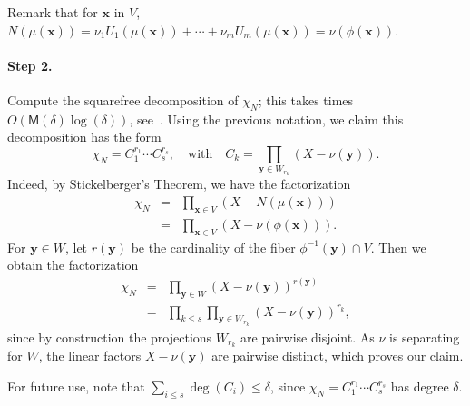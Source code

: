 \documentclass[12pt]{article}
\def\M {\ensuremath{\mathsf{M}}}
\def\x {\ensuremath{\mathbf{x}}}
\def\y {\ensuremath{\mathbf{y}}}
\begin{document}
Remark that for $\x$ in $V$, $N(\mu(\x))=\nu_1 U_1(\mu(\x)) + \cdots +
\nu_m U_m(\mu(\x))=\nu(\phi(\x))$.

\paragraph{Step 2.} Compute the squarefree decomposition of
$\chi_N$; this takes times $O(\M(\delta)\log(\delta))$,
see~\cite[Chapter~14]{GaGe03}.  Using the previous notation, we claim
this decomposition has the form
\[
\chi_N = C_1^{r_1} \cdots C_s^{r_s}, \quad\text{with}\quad C_k =
\prod_{\y \in W_{r_k}} (X-\nu(\y)).
\]
Indeed, by Stickelberger's Theorem, we have the factorization
\[
\begin{array}{rcl}
  \chi_N &=& \prod_{\x \in V} (X-N(\mu(\x)))\\[2mm]
  &=& \prod_{\x \in V} (X-\nu(\phi(\x))).
\end{array}
\]
For $\y\in W$, let $r(\y)$ be the cardinality of the fiber
$\phi^{-1}(\y) \cap V$. Then we obtain the factorization
\[
\begin{array}{rcl}
  \chi_N&=& \prod_{\y \in W} (X-\nu(\y))^{r(\y)} \\[2mm]
  &=& \prod_{k \le s} \prod_{\y \in W_{r_k}} (X-\nu(\y))^{r_k},
\end{array}
\]
since by construction the projections $W_{r_k}$ are pairwise
disjoint. As $\nu$ is separating for $W$, the linear factors
$X-\nu(\y)$ are pairwise distinct, which proves our claim.

For future use, note that $\sum_{i \le s} \deg(C_i) \le \delta$, since
$\chi_N=C_1^{r_1} \cdots C_s^{r_s}$ has degree $\delta$.
\end{document}

